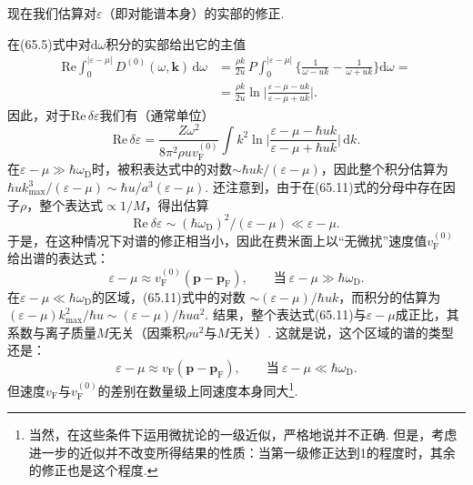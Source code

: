 现在我们估算对$\varepsilon$（即对能谱本身）的实部的修正.

在(65.5)式中对$\mathrm{d}\omega$积分的实部给出它的主值
\begin{equation*}
\begin{aligned}
\mathrm{Re}\int_0^{|\varepsilon-\mu|}D^{(0)}(\omega,\bm{k})\,\mathrm{d}\omega
&=\frac{\rho k}{2u}\,P\int_0^{|\varepsilon-\mu|}
\biggl\{\frac{1}{\omega-uk}-\frac{1}{\omega+uk}\biggr\}\mathrm{d}\omega=\\
&=\frac{\rho k}{2u}\ln\biggl|\frac{\varepsilon-\mu-uk}{\varepsilon-\mu+uk}\biggr|.
\end{aligned}
\end{equation*}
因此，对于$\mathrm{Re}\,\delta\varepsilon$我们有（通常单位）
\begin{equation}
\mathrm{Re}\,\delta\varepsilon=\frac{Z\omega^2}{8\pi^2\rho uv^{(0)}_{\mathrm F}}
\int k^2\ln\biggl|\frac{\varepsilon-\mu-\hbar uk}{\varepsilon-\mu+\hbar uk}\biggr|
\,\mathrm{d}k.
\end{equation}
在$\varepsilon-\mu\gg\hbar\omega_{\mathrm D}$时，被积表达式中的对数$\sim\hbar uk/(\varepsilon-\mu)$，因此整个积分估算为
$\hbar uk^3_{\max}/(\varepsilon-\mu)\sim\hbar u/a^3(\varepsilon-\mu)$. 还注意到，由于在(65.11)式的分母中存在因子$\rho$，整个表达式$\propto1/M$，得出估算
\begin{equation*}
\mathrm{Re}\ \delta\varepsilon\sim(\hbar\omega_{\mathrm D})^2/(\varepsilon-\mu)
\ll\varepsilon-\mu.
\end{equation*}
于是，在这种情况下对谱的修正相当小，因此在费米面上以“无微扰”速度值$v^{(0)}_{\mathrm F}$给出谱的表达式：
\begin{equation}
\varepsilon-\mu\approx v^{(0)}_{\mathrm F}(\bm{p}-\bm{p}_{\mathrm F}),
\qquad \text{当}\ \varepsilon-\mu\gg\hbar\omega_{\mathrm D}.
\end{equation}
在$\varepsilon-\mu\ll\hbar\omega_{\mathrm D}$的区域，(65.11)式中的对数
$\sim(\varepsilon-\mu)/\hbar uk$，而积分的估算为
$(\varepsilon-\mu)k^2_{\max}/\hbar u\sim(\varepsilon-\mu)/\hbar ua^2$. 结果，整个表达式(65.11)与$\varepsilon-\mu$成正比，其系数与离子质量$M$无关（因乘积$\rho u^2$与$M$无关）. 这就是说，这个区域的谱的类型还是：
\begin{equation}
\varepsilon-\mu\approx v_{\mathrm F}(\bm{p}-\bm{p}_{\mathrm F}),
\qquad \text{当}\ \varepsilon-\mu\ll\hbar\omega_{\mathrm D}.
\end{equation}
但速度$v_{\mathrm F}$与$v^{(0)}_{\mathrm F}$的差别在数量级上同速度本身同大\footnote{当然，在这些条件下运用微扰论的一级近似，严格地说并不正确. 但是，考虑进一步的近似并不改变所得结果的性质：当第一级修正达到1的程度时，其余的修正也是这个程度.}.

